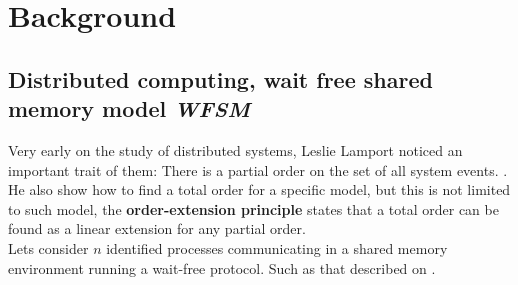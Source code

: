 \documentclass[oneside,openany]{tufte-book} %
\newcommand{\sh}{\textbf{\textit{WFSM}}\xspace}
\begin{document}
%






\chapter{Background} %
\section{Distributed computing, wait free shared memory model \sh}

Very early on the study of distributed systems, Leslie Lamport noticed an important trait of them: There is a partial order on the set of all system events. \cite{Lamport78}. He also show how to find a total order for a specific model, but this is not limited to such model, the {\bf order-extension principle} states that a total order can be found as a linear extension for any partial order.\\

Lets consider $n$ identified processes communicating in a shared memory environment running a wait-free protocol. Such as that described on \cite{Herlihy1999}.\\
\end{document}
